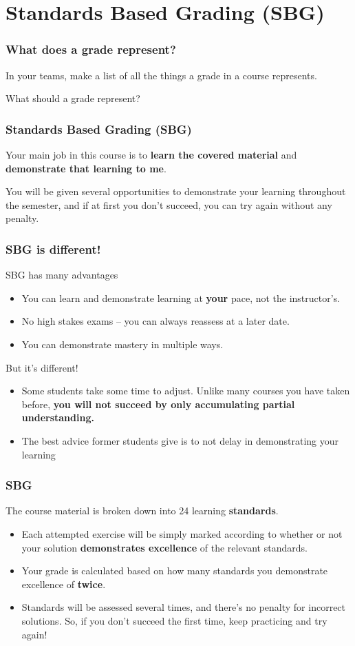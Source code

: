 \documentclass[aspectration=1610]{beamer}
\begin{document}
\section{Standards Based Grading (SBG)}
\begin{frame}\frametitle{What does a grade represent?}

In your teams, make a list of all the things a grade in a course represents.
\vfill

\pause
What should a grade represent?
\vfill
\end{frame}



\begin{frame}\frametitle{Standards Based Grading (SBG)}
Your main job in this course is to \textbf{learn the covered material}
and \textbf{demonstrate that learning to me}.

\vspace{0.2in}
\pause

You will be given several opportunities to demonstrate your learning throughout
the semester, and if
at first you don't succeed, you can try again without any penalty.
\end{frame}

\begin{frame}\frametitle{SBG is different!}
SBG has many advantages
\begin{itemize}
\item You can learn and demonstrate learning at \textbf{your} pace, not the instructor's.
\item No high stakes exams -- you can always reassess at a later date.
\item You can demonstrate mastery in multiple ways.
\end{itemize}
\vfill
But it's different!
\begin{itemize}
\item Some students take some time to adjust.  Unlike many courses you have taken before, \textbf{you will not succeed by only accumulating partial understanding.}
\item The best advice former students give is to not delay in demonstrating your learning
\end{itemize}
\end{frame}




\begin{frame}\frametitle{SBG}
The course material is broken down into 24 learning \textbf{standards}.
\begin{itemize}
\item Each attempted exercise will be simply marked according to whether or not
      your solution \textbf{demonstrates excellence} of the relevant standards.
\item Your grade is calculated based on how many standards you demonstrate excellence of \textbf{twice}.
\item Standards will be assessed several times, and there's no penalty for
      incorrect solutions. So, if you don't succeed the first time,
      keep practicing and try again!
\end{itemize}
\end{frame}
\end{document}
